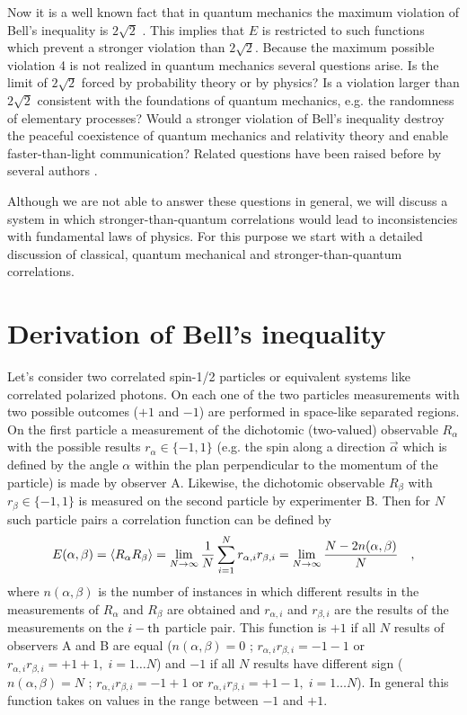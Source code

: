 Now it is a well known fact that in quantum mechanics the maximum violation
of Bell\rq s inequality is $2\sqrt{2}$ \cite{cirelson:80,cirelson}.
This implies that $E$ is restricted to such functions
which prevent a stronger violation than $2\sqrt{2}$.
Because the maximum possible violation 4 is not realized in quantum
mechanics several questions arise.
Is the limit of $2\sqrt{2}$ forced by probability theory or by physics?
Is a violation larger than $2\sqrt{2}$ consistent with the
foundations of quantum mechanics, e.g. the randomness of elementary
processes? Would a stronger violation of Bell\rq s inequality destroy the
peaceful coexistence of quantum mechanics and relativity theory and enable
faster-than-light communication? Related questions have been raised
before by several authors
\cite{shimony2,shimony3,pop-rohr,rohrlich-97,grunhaus-96,popescu-97}.

Although we are not able to answer these questions in general, we will
discuss a system in which stronger-than-quantum correlations would lead to
inconsistencies with fundamental laws of physics.
For this purpose we start with a detailed discussion of classical,
quantum mechanical and stronger-than-quantum correlations.

\section{Derivation of Bell\rq s inequality}
\noindent
Let\rq s consider two correlated spin-1/2 particles or equivalent
systems like correlated polarized photons. On each one of the two particles
measurements with two possible outcomes ($+1$ and $-1$)
are performed in space-like separated regions.
On the first particle a measurement of the dichotomic
(two-valued) observable
$R_\alpha$ with the possible results $r_\alpha \in \{-1,1\}$
(e.g. the spin along a direction $\vec{\alpha}$ which is defined by the
angle $\alpha$ within the plan perpendicular to the momentum of the particle)
is made by observer A. Likewise,
the dichotomic observable $R_\beta$ with $r_\beta \in \{-1,1\}$
is measured on the second particle by experimenter B.
Then for $N$ such particle pairs a correlation function can be defined by
\begin{equation}
E(\alpha ,\beta )=\langle R_\alpha R_\beta \rangle =
\lim_{N \rightarrow \infty}{1\over N}
\sum_{i=1}^N  r_{\alpha,i} r_{\beta,i} =
\lim_{N \rightarrow \infty}
\frac{N - 2 n(\alpha,\beta)}{N}
\quad ,
\label{e-1}
\end{equation}
where $n(\alpha,\beta)$ is the number of instances in which different
results in the
measurements of $R_\alpha$ and $R_\beta$ are obtained and
$r_{\alpha,i}$ and $r_{\beta,i}$ are the results of the measurements
on the $i-{\rm th}$ particle pair. This function is $+1$ if all $N$
results of observers A and B are equal
($n(\alpha,\beta)=0$ ;
$r_{\alpha,i} r_{\beta,i} = -1-1$ or
$r_{\alpha,i} r_{\beta,i} = +1+1 , \; i=1 \dots N$) and
$-1$ if all $N$ results have different sign
($n(\alpha,\beta)=N$ ;
$r_{\alpha,i} r_{\beta,i} = -1 +1$ or
$r_{\alpha,i} r_{\beta,i} = +1 -1 , \; i=1 \dots N$).
In general this function takes on values in the range between $-1$ and $+1$.

